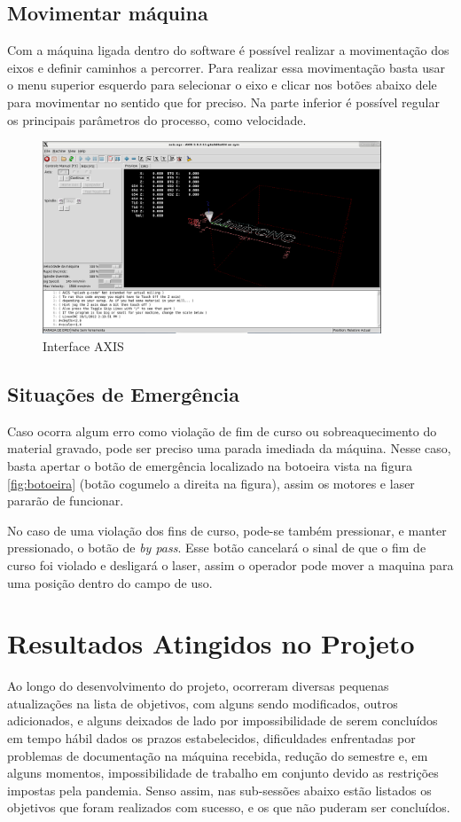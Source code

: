 \documentclass[
	article,			%
	11pt,				%
	oneside,			%
	a4paper,			%
	section=TITLE,		%
	english,			%
	brazil,				%
	sumario=tradicional
	]{abntex2}
\begin{document}
\subsection{Movimentar máquina}

Com a máquina ligada dentro do software é possível realizar a movimentação dos eixos e definir caminhos a percorrer. Para realizar essa movimentação basta usar o menu superior esquerdo para selecionar o eixo e clicar nos botões abaixo dele para movimentar no sentido que for preciso. Na parte inferior é possível regular os principais parâmetros do processo, como velocidade.

\begin{figure}[H]
    \centering
    \includegraphics[width=0.9\textwidth]{img/axis.png}
    \caption{Interface AXIS}
    \label{fig:linuxcnc-axis}
\end{figure}

\subsection{Situações de Emergência}

Caso ocorra algum erro como violação de fim de curso ou sobreaquecimento do material gravado, pode ser preciso uma parada imediada da máquina. Nesse caso, basta apertar o botão de emergência localizado na botoeira vista na figura \ref{fig:botoeira} (botão cogumelo a direita na figura), assim os motores e laser pararão de funcionar.

No caso de uma violação dos fins de curso, pode-se também pressionar, e manter pressionado, o botão de \textit{by pass}. Esse botão cancelará o sinal de que o fim de curso foi violado e desligará o laser, assim o operador pode mover a maquina para uma posição dentro do campo de uso.

\section{Resultados Atingidos no Projeto}
Ao longo do desenvolvimento do projeto, ocorreram diversas pequenas atualizações na lista de objetivos, com alguns sendo modificados, outros adicionados, e alguns deixados de lado por impossibilidade de serem concluídos em tempo hábil dados os prazos estabelecidos, dificuldades enfrentadas por problemas de documentação na máquina recebida, redução do semestre e, em alguns momentos, impossibilidade de trabalho em conjunto devido as restrições impostas pela pandemia. Senso assim, nas sub-sessões abaixo estão listados os objetivos que foram realizados com sucesso, e os que não puderam ser concluídos.
\end{document}
